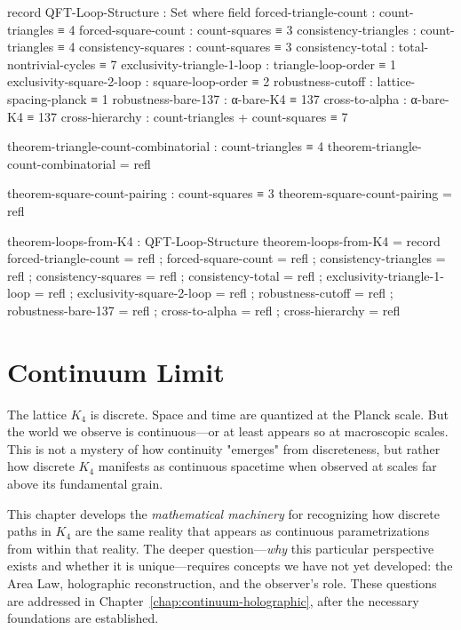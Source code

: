 \documentclass[11pt,a4paper]{book}
\begin{document}
\begin{code}
record QFT-Loop-Structure : Set where
  field
    forced-triangle-count : count-triangles ≡ 4
    forced-square-count : count-squares ≡ 3
    consistency-triangles : count-triangles ≡ 4
    consistency-squares : count-squares ≡ 3
    consistency-total : total-nontrivial-cycles ≡ 7
    exclusivity-triangle-1-loop : triangle-loop-order ≡ 1
    exclusivity-square-2-loop : square-loop-order ≡ 2
    robustness-cutoff : lattice-spacing-planck ≡ 1
    robustness-bare-137 : α-bare-K4 ≡ 137
    cross-to-alpha : α-bare-K4 ≡ 137
    cross-hierarchy : count-triangles + count-squares ≡ 7

theorem-triangle-count-combinatorial : count-triangles ≡ 4
theorem-triangle-count-combinatorial = refl

theorem-square-count-pairing : count-squares ≡ 3
theorem-square-count-pairing = refl

theorem-loops-from-K4 : QFT-Loop-Structure
theorem-loops-from-K4 = record
  { forced-triangle-count = refl
  ; forced-square-count = refl
  ; consistency-triangles = refl
  ; consistency-squares = refl
  ; consistency-total = refl
  ; exclusivity-triangle-1-loop = refl
  ; exclusivity-square-2-loop = refl
  ; robustness-cutoff = refl
  ; robustness-bare-137 = refl
  ; cross-to-alpha = refl
  ; cross-hierarchy = refl
  }

\end{code}

\chapter{Continuum Limit}
\label{chap:continuum-limit}

The lattice $K_4$ is discrete. Space and time are quantized at the Planck scale. But the 
world we observe is continuous—or at least appears so at macroscopic scales. This is not 
a mystery of how continuity "emerges" from discreteness, but rather how discrete $K_4$ 
manifests as continuous spacetime when observed at scales far above its fundamental grain.

This chapter develops the \emph{mathematical machinery} for recognizing how discrete paths 
in $K_4$ are the same reality that appears as continuous parametrizations from within that 
reality. The deeper question—\emph{why} this particular perspective exists and whether it is 
unique—requires concepts we have not yet developed: the Area Law, holographic reconstruction, 
and the observer's role. These questions are addressed in Chapter~\ref{chap:continuum-holographic}, 
after the necessary foundations are established.
\end{document}
